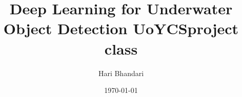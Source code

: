 \title{Deep Learning for Underwater Object Detection
\textsf{UoYCSproject} class}
\author{Hari Bhandari}
\date{\today}
\BSc

